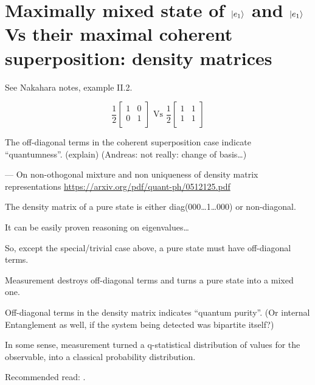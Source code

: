 \section{Maximally mixed state of $\ket{e_1}$ and $\ket{e_1}$
Vs their maximal coherent superposition: density matrices}

See Nakahara notes, example II.2.

$$
\frac{1}{2}\begin{bmatrix}
  1 &0  \\
  0 &1  \\
\end{bmatrix}
\text{ Vs }
\frac{1}{2}\begin{bmatrix}
  1 &1  \\
  1 &1  \\
\end{bmatrix}
$$

The off-diagonal terms in the coherent superposition case indicate
``quantumness''. (explain) (Andreas: not really: change of basis\dots)

--- On non-othogonal mixture and non uniqueness of density matrix representations
\url{https://arxiv.org/pdf/quant-ph/0512125.pdf}

\begin{remark}
  The density matrix of a pure state is either diag(000\dots1\dots000) or non-diagonal.

  It can be easily proven reasoning on eigenvalues\dots

  So, except the special/trivial case above, a pure state must have off-diagonal terms.
\end{remark}

Measurement destroys off-diagonal terms and turns a pure state into a mixed one.

Off-diagonal terms in the density matrix indicates ``quantum purity''.
(Or internal Entanglement as well, if the system being detected was bipartite itself?)

In some sense, measurement turned a q-statistical distribution of values for the observable,
into a classical probability distribution.

Recommended read: \cite{Zurek_Decoherence, Zurek_Fundamentals}.

